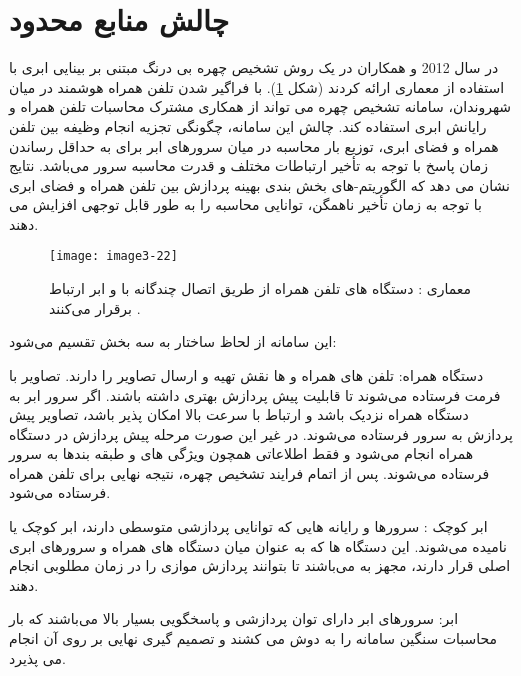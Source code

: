 \section{چالش منابع محدود}
در سال 2012  و همکاران در \cite{6249269} یک روش تشخیص چهره بی درنگ مبتنی بر بینایی ابری  با استفاده از معماری  ارائه کردند (شکل \ref{image3-22}). با فراگیر شدن تلفن همراه هوشمند در میان شهروندان، سامانه تشخیص چهره می تواند از همکاری مشترک محاسبات تلفن همراه و رایانش ابری استفاده کند. چالش این سامانه، چگونگی تجزیه انجام وظیفه بین تلفن همراه و فضای ابری، توزیع بار محاسبه در میان سرورهای ابر برای به حداقل رساندن زمان پاسخ با توجه به تأخیر ارتباطات مختلف و قدرت محاسبه سرور می‌باشد. نتایج نشان می دهد که الگوریتم-های بخش بندی بهینه پردازش بین تلفن همراه و فضای ابری با توجه به زمان تأخیر ناهمگن، توانایی محاسبه را به طور قابل توجهی افزایش می دهند. 

\begin{figure}[h]
\centering
  \texttt{[image: image3-22]}
  \caption{معماری : دستگاه های تلفن همراه از طریق اتصال چندگانه با  و ابر ارتباط برقرار می‌کنند \cite{6249269}.}
  \label{image3-22}
\end{figure}

\noindent
این سامانه از لحاظ ساختار به سه بخش تقسیم می‌شود:

\noindent
دستگاه همراه: تلفن های همراه و  ها نقش تهیه و ارسال تصاویر را دارند. تصاویر با فرمت  فرستاده می‌شوند تا قابلیت پیش پردازش بهتری داشته باشند. اگر سرور ابر به دستگاه همراه نزدیک باشد و ارتباط با سرعت بالا امکان پذیر باشد، تصاویر پیش پردازش به سرور فرستاده می‌شوند. در غیر این صورت مرحله پیش پردازش در دستگاه همراه انجام می‌شود و فقط اطلاعاتی همچون ویژگی های  و طبقه بندها به سرور فرستاده می‌شوند. پس از اتمام فرایند تشخیص چهره، نتیجه نهایی برای تلفن همراه فرستاده می‌شود.

\noindent
ابر کوچک : سرورها و رایانه هایی که توانایی پردازشی متوسطی دارند، ابر کوچک یا  نامیده می‌شوند. این دستگاه ها که به عنوان میان دستگاه های همراه و سرورهای ابری اصلی قرار دارند، مجهز به  می‌باشند تا بتوانند پردازش موازی را در زمان مطلوبی انجام دهند.

\noindent
ابر: سرورهای ابر دارای توان پردازشی و پاسخگویی بسیار بالا می‌باشند که بار محاسبات سنگین سامانه را به دوش می کشند و تصمیم گیری نهایی بر روی آن انجام می پذیرد.

